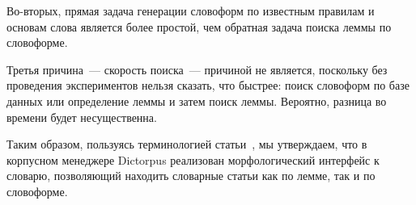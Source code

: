 Во-вторых, прямая задача генерации словоформ по известным правилам и основам слова является более простой, чем обратная задача поиска леммы по словоформе.

Третья причина~--- скорость поиска~--- причиной не является, 
поскольку без проведения экспериментов нельзя сказать, что быстрее: 
поиск словоформ по базе данных или определение леммы и затем поиск леммы. 
Вероятно, разница во времени будет несущественна.

Таким образом, пользуясь терминологией статьи~\cite{morphoAPI2dict2004Maxwell}, 
мы утверждаем, что в корпусном менеджере Dictorpus 
реализован морфологический интерфейс к словарю, 
позволяющий находить словарные статьи как по лемме, так и по словоформе.

